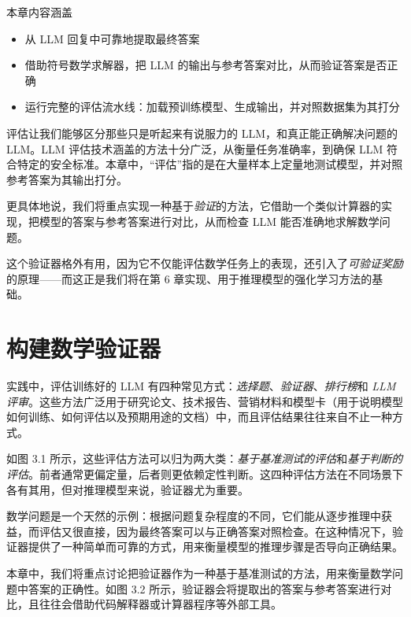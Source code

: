 \begin{myChapterIntro}{本章内容涵盖}
\begin{itemize}
\item 从 LLM 回复中可靠地提取最终答案
\item 借助符号数学求解器，把 LLM 的输出与参考答案对比，从而验证答案是否正确
\item 运行完整的评估流水线：加载预训练模型、生成输出，并对照数据集为其打分
\end{itemize}
\end{myChapterIntro}

评估让我们能够区分那些只是听起来有说服力的 LLM，和真正能正确解决问题的 LLM。LLM 评估技术涵盖的方法十分广泛，从衡量任务准确率，到确保 LLM 符合特定的安全标准。本章中，“评估”指的是在大量样本上定量地测试模型，并对照参考答案为其输出打分。

更具体地说，我们将重点实现一种基于\emph{验证}的方法，它借助一个类似计算器的实现，把模型的答案与参考答案进行对比，从而检查 LLM 能否准确地求解数学问题。

这个验证器格外有用，因为它不仅能评估数学任务上的表现，还引入了\emph{可验证奖励}的原理——而这正是我们将在第 6 章实现、用于推理模型的强化学习方法的基础。

\section{构建数学验证器}

实践中，评估训练好的 LLM 有四种常见方式：\emph{选择题}、\emph{验证器}、\emph{排行榜}和 \emph{LLM 评审}。这些方法广泛用于研究论文、技术报告、营销材料和模型卡（用于说明模型如何训练、如何评估以及预期用途的文档）中，而且评估结果往往来自不止一种方式。

如图 3.1 所示，这些评估方法可以归为两大类：\emph{基于基准测试的评估}和\emph{基于判断的评估}。前者通常更偏定量，后者则更依赖定性判断。这四种评估方法在不同场景下各有其用，但对推理模型来说，验证器尤为重要。


数学问题是一个天然的示例：根据问题复杂程度的不同，它们能从逐步推理中获益，而评估又很直接，因为最终答案可以与正确答案对照检查。在这种情况下，验证器提供了一种简单而可靠的方式，用来衡量模型的推理步骤是否导向正确结果。

本章中，我们将重点讨论把验证器作为一种基于基准测试的方法，用来衡量数学问题中答案的正确性。如图 3.2 所示，验证器会将提取出的答案与参考答案进行对比，且往往会借助代码解释器或计算器程序等外部工具。

